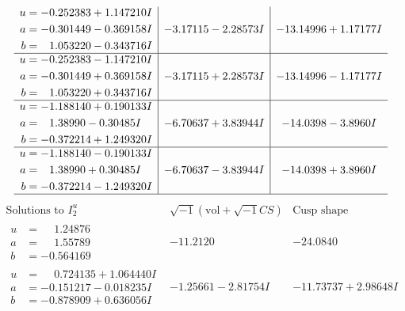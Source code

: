 \documentclass[1p]{elsarticle_modified}
\theoremstyle{definition}
\newcommand{\I}{\sqrt{-1}}
\begin{document}
$$\begin{array}{c|c|c}
\begin{aligned}
u &= -0.252383 + 1.147210 I \\
a &= -0.301449 - 0.369158 I \\
b &= \phantom{-}1.053220 - 0.343716 I\end{aligned}
 & -3.17115 - 2.28573 I & -13.14996 + 1.17177 I \\ \hline\begin{aligned}
u &= -0.252383 - 1.147210 I \\
a &= -0.301449 + 0.369158 I \\
b &= \phantom{-}1.053220 + 0.343716 I\end{aligned}
 & -3.17115 + 2.28573 I & -13.14996 - 1.17177 I \\ \hline\begin{aligned}
u &= -1.188140 + 0.190133 I \\
a &= \phantom{-}1.38990 - 0.30485 I \\
b &= -0.372214 + 1.249320 I\end{aligned}
 & -6.70637 + 3.83944 I & -14.0398 - 3.8960 I \\ \hline\begin{aligned}
u &= -1.188140 - 0.190133 I \\
a &= \phantom{-}1.38990 + 0.30485 I \\
b &= -0.372214 - 1.249320 I\end{aligned}
 & -6.70637 - 3.83944 I & -14.0398 + 3.8960 I\\
 \hline 
 \end{array}$$\newpage$$\begin{array}{c|c|c}  
\text{Solutions to }I^u_{2}& \I (\text{vol} + \sqrt{-1}CS) & \text{Cusp shape}\\
 \hline 
\begin{aligned}
u &= \phantom{-}1.24876\phantom{ +0.000000I} \\
a &= \phantom{-}1.55789\phantom{ +0.000000I} \\
b &= -0.564169\phantom{ +0.000000I}\end{aligned}
 & -11.2120\phantom{ +0.000000I} & -24.0840\phantom{ +0.000000I} \\ \hline\begin{aligned}
u &= \phantom{-}0.724135 + 1.064440 I \\
a &= -0.151217 - 0.018235 I \\
b &= -0.878909 + 0.636056 I\end{aligned}
 & -1.25661 - 2.81754 I & -11.73737 + 2.98648 I \\ \hline\begin{aligned}

\end{aligned}
\end{array}$$
\end{document}
